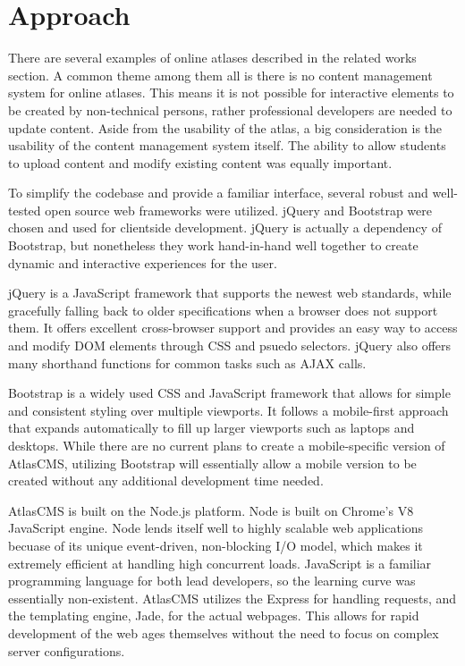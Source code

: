 \documentclass[11pt, final, conference, twocolumn]{IEEEtran}
\begin{document}
\section{Approach}
There are several examples of online atlases described in the related works section. A common theme among them all is there is no content management system for online atlases.  This means it is not possible for interactive elements to be created by non-technical persons, rather professional developers are needed to update content. Aside from the usability of the atlas, a big consideration is the usability of the content management system itself.  The ability to allow students to upload content and modify existing content was equally important.

To simplify the codebase and provide a familiar interface, several robust and well-tested open source web frameworks were utilized. jQuery and Bootstrap were chosen and used for clientside development. jQuery is actually a dependency of Bootstrap, but nonetheless they work hand-in-hand well together to create dynamic and interactive experiences for the user.

jQuery is a JavaScript framework that supports the newest web standards, while gracefully falling back to older specifications when a browser does not support them.  It offers excellent cross-browser support and provides an easy way to access and modify DOM elements through CSS and psuedo selectors.  jQuery also offers many shorthand functions for common tasks such as AJAX calls.

Bootstrap is a widely used CSS and JavaScript framework that allows for simple and consistent styling over multiple viewports.  It follows a mobile-first approach that expands automatically to fill up larger viewports such as laptops and desktops. While there are no current plans to create a mobile-specific version of AtlasCMS, utilizing Bootstrap will essentially allow a mobile version to be created without any additional development time needed.

AtlasCMS is built on the Node.js platform. Node is built on Chrome's V8 JavaScript engine.  Node lends itself well to highly scalable web applications becuase of its unique event-driven, non-blocking I/O model, which makes it extremely efficient at handling high concurrent loads.  JavaScript is a familiar programming language for both lead developers, so the learning curve was essentially non-existent.  AtlasCMS utilizes the Express for handling requests, and the templating engine, Jade, for the actual webpages.  This allows for rapid development of the web ages themselves without the need to focus on complex server configurations.
\end{document}
